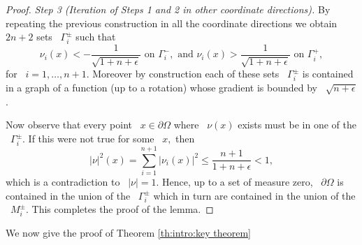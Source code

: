 \documentclass[reqno,12pt]{amsart}
\newcommand{\delomega}{\partial\Omega}
\numberwithin{equation}{section}
\theoremstyle{plain}
\theoremstyle{definition}
\renewcommand{\leq}{\leqslant}
\begin{document}
\begin{proof}
\textit{Step 3 (Iteration of Steps 1 and 2 in other coordinate directions).}
By repeating the previous construction in all the coordinate directions we obtain ~$2n+2$ sets ~$\Gamma_i^{\pm}$ such that 
$$
  \nu_i(x)<-\frac{1}{\sqrt{1+n+\epsilon}}\text{ on }\Gamma_i^{-},\text{ and }
  \nu_i(x)>\frac{1}{\sqrt{1+n+\epsilon}}\text{ on }\Gamma_i^{+},
$$
for ~$i=1,\ldots,n+1$. Moreover by construction each of these sets ~$\Gamma_i^{\pm}$ is contained in a graph of a function (up to a rotation) whose gradient is bounded by ~$\sqrt{n+\epsilon}$. 

Now observe that every point ~$x\in \delomega$ where ~$\nu(x)$ exists must be in one of the ~$\Gamma_i^{\pm}.$ If this were not true for some ~$x,$ then 
$$
  |\nu|^2(x)=\sum_{i=1}^{n+1}|\nu_i(x)|^2\leq\frac{n+1}{1+n+\epsilon}<1,
$$
which is a contradiction to ~$|\nu|=1$. Hence, up to a set of measure zero, ~$\delomega$ is contained in the union of the ~$\Gamma_i^{\pm}$ which in turn are contained in the union of the ~$M_i^{\pm}.$ This completes the proof of the lemma. 
\end{proof}

We now  give the proof of Theorem \ref{th:intro:key theorem}
\end{document}

